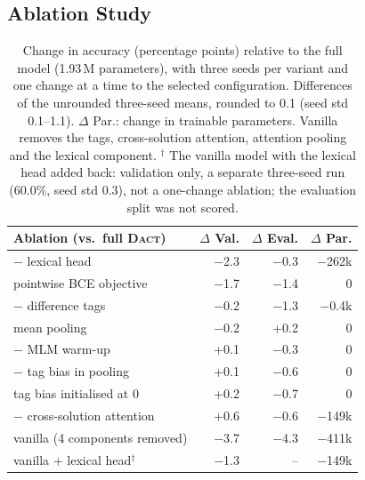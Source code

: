 \documentclass[11pt]{article}
\newcommand{\dact}{\textsc{Dact}}
\begin{document}
\subsection{Ablation Study}\label{sec:ablation}
\begin{table}[t]
\centering\small
\setlength{\tabcolsep}{4pt}
\begin{tabular}{@{}lrrr@{}}
\toprule
Ablation (vs.\ full \dact{}) & $\Delta$ Val. & $\Delta$ Eval. & $\Delta$ Par. \\
\midrule
$-$ lexical head & $-$2.3 & $-$0.3 & $-$262k \\
pointwise BCE objective & $-$1.7 & $-$1.4 & 0 \\
$-$ difference tags & $-$0.2 & $-$1.3 & $-$0.4k \\
mean pooling & $-$0.2 & +0.2 & 0 \\
$-$ MLM warm-up & +0.1 & $-$0.3 & 0 \\
$-$ tag bias in pooling & +0.1 & $-$0.6 & 0 \\
tag bias initialised at 0 & +0.2 & $-$0.7 & 0 \\
$-$ cross-solution attention & +0.6 & $-$0.6 & $-$149k \\
\midrule
vanilla (4 components removed) & $-$3.7 & $-$4.3 & $-$411k \\
vanilla + lexical head$^{\dagger}$ & $-$1.3 & -- & $-$149k \\
\bottomrule
\end{tabular}
\caption{Change in accuracy (percentage points) relative to the full model (1.93\,M parameters), with three seeds per variant and one change at a time to the selected configuration. Differences of the unrounded three-seed means, rounded to 0.1 (seed std 0.1--1.1). $\Delta$ Par.: change in trainable parameters. Vanilla removes the tags, cross-solution attention, attention pooling and the lexical component. $^{\dagger}$ The vanilla model with the lexical head added back: validation only, a separate three-seed run (60.0\%, seed std 0.3), not a one-change ablation; the evaluation split was not scored.}
\label{tab:abl}
\end{table}
\end{document}

